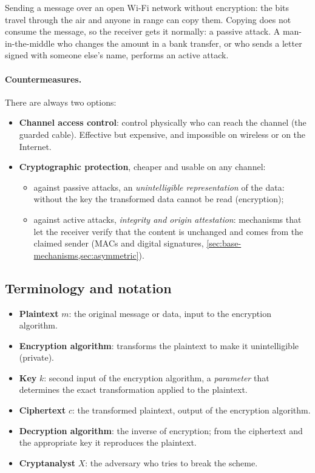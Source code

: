 \begin{example}
Sending a message over an open Wi-Fi network without encryption: the bits travel through the air and anyone in range can copy them. Copying does not consume the message, so the receiver gets it normally: a passive attack. A man-in-the-middle who changes the amount in a bank transfer, or who sends a letter signed with someone else's name, performs an active attack.
\end{example}

\paragraph{Countermeasures.} There are always two options:
\begin{itemize}
    \item \textbf{Channel access control}: control physically who can reach the channel (the guarded cable). Effective but expensive, and impossible on wireless or on the Internet.
    \item \textbf{Cryptographic protection}, cheaper and usable on any channel:
    \begin{itemize}
        \item against passive attacks, an \emph{unintelligible representation} of the data: without the key the transformed data cannot be read (encryption);
        \item against active attacks, \emph{integrity and origin attestation}: mechanisms that let the receiver verify that the content is unchanged and comes from the claimed sender (MACs and digital signatures, \cref{sec:base-mechanisms,sec:asymmetric}).
    \end{itemize}
\end{itemize}

\subsection{Terminology and notation}

\begin{definition}
\leavevmode
\begin{itemize}
    \item \textbf{Plaintext} $m$: the original message or data, input to the encryption algorithm.
    \item \textbf{Encryption algorithm}: transforms the plaintext to make it unintelligible (private).
    \item \textbf{Key} $k$: second input of the encryption algorithm, a \emph{parameter} that determines the exact transformation applied to the plaintext.
    \item \textbf{Ciphertext} $c$: the transformed plaintext, output of the encryption algorithm.
    \item \textbf{Decryption algorithm}: the inverse of encryption; from the ciphertext and the appropriate key it reproduces the plaintext.
    \item \textbf{Cryptanalyst} $X$: the adversary who tries to break the scheme.
\end{itemize}
\end{definition}

